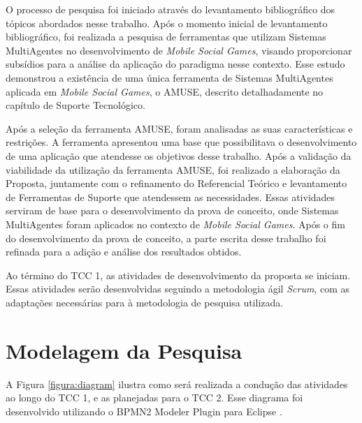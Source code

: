 O processo de pesquisa foi iniciado através do levantamento bibliográfico dos tópicos abordados nesse trabalho. Após o momento inicial de levantamento bibliográfico, foi realizada a pesquisa de ferramentas que utilizam Sistemas MultiAgentes no desenvolvimento de \textit{Mobile Social Games}, visando proporcionar subsídios para a análise da aplicação do paradigma nesse contexto. Esse estudo demonstrou a existência de uma única ferramenta de Sistemas MultiAgentes aplicada em \textit{Mobile Social Games}, o AMUSE, descrito detalhadamente no capítulo de Suporte Tecnológico.

Após a seleção da ferramenta AMUSE, foram analisadas as suas características e restrições. A ferramenta apresentou uma base que possibilitava o desenvolvimento de uma aplicação que atendesse os objetivos desse trabalho. Após a validação da viabilidade da utilização da ferramenta AMUSE, foi realizado a elaboração da Proposta, juntamente com o refinamento do Referencial Teórico e levantamento de Ferramentas de Suporte que atendessem as necessidades. Essas atividades serviram de base para o desenvolvimento da prova de conceito, onde Sistemas MultiAgentes foram aplicados no contexto de \textit{Mobile Social Games}. Após o fim do desenvolvimento da prova de conceito, a parte escrita desse trabalho foi refinada para a adição e análise dos resultados obtidos.

Ao término do TCC 1, as atividades de desenvolvimento da proposta se iniciam. Essas atividades serão desenvolvidas seguindo a metodologia ágil \textit{Scrum}, com as adaptações necessárias para à metodologia de pesquisa utilizada.

\section{Modelagem da Pesquisa}

A Figura \ref{figura:diagram} ilustra como será realizada a condução das atividades ao longo do TCC 1, e as planejadas para o TCC 2. Esse diagrama foi desenvolvido utilizando o BPMN2 Modeler Plugin para Eclipse \cite{eclipse}.



